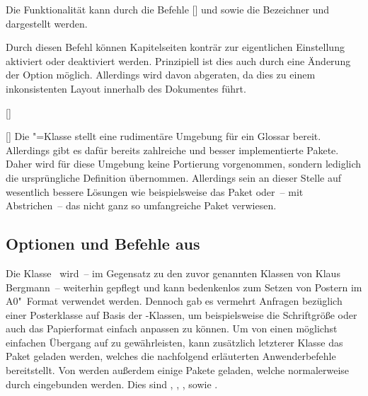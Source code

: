 \begin{Bundle*}{}
\begin{Declaration}{}
\printdeclarationlist%
%
Die Funktionalität kann durch die Befehle [] 
und  sowie die Bezeichner  und 
 dargestellt werden.
\end{Declaration}

\begin{Declaration}{}
\printdeclarationlist%
%
Durch diesen Befehl können Kapitelseiten konträr zur eigentlichen Einstellung 
aktiviert oder deaktiviert werden. Prinzipiell ist dies auch durch eine 
Änderung der Option  möglich. Allerdings wird davon 
abgeraten, da dies zu einem inkonsistenten Layout innerhalb des Dokumentes 
führt.
\end{Declaration}

\begin{Declaration}{[]}
\begin{Declaration}{[]}
\printdeclarationlist%
%
Die "=Klasse stellt eine rudimentäre Umgebung für ein Glossar 
bereit. Allerdings gibt es dafür bereits zahlreiche und besser implementierte 
Pakete. Daher wird für diese Umgebung keine Portierung vorgenommen, sondern 
lediglich die ursprüngliche Definition übernommen. Allerdings sein an dieser 
Stelle auf wesentlich bessere Lösungen wie beispielsweise das Paket 
 oder~-- mit Abstrichen~-- das nicht ganz so umfangreiche 
Paket  verwiesen.
\end{Declaration}
\end{Declaration}
%

\subsection{Optionen und Befehle aus }
%
%
Die Klasse~ wird~-- im Gegensatz zu den zuvor genannten 
Klassen von Klaus Bergmann~-- weiterhin gepflegt und kann bedenkenlos zum 
Setzen von Postern im A0"~Format verwendet werden. Dennoch gab es vermehrt 
Anfragen bezüglich einer Posterklasse auf Basis der \TUDScript-Klassen, um 
beispielsweise die Schriftgröße oder auch das Papierformat einfach anpassen zu 
können. Um von  einen möglichst einfachen Übergang auf 
 zu gewährleisten, kann zusätzlich letzterer Klasse das 
Paket  geladen werden, welches die nachfolgend erläuterten 
Anwenderbefehle bereitstellt. Von  werden außerdem einige 
Pakete geladen, welche normalerweise durch  eingebunden 
werden. Dies sind , , , 
 sowie .


\end{Bundle*}
